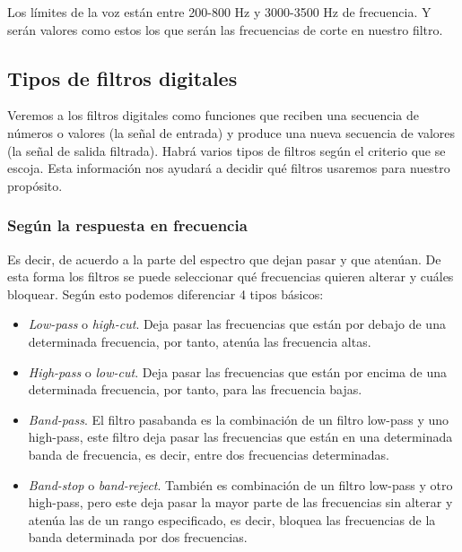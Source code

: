 Los límites de la voz están entre 200-800 Hz y 3000-3500 Hz de frecuencia. Y serán valores como estos los que serán las frecuencias de corte en nuestro filtro.

\subsection{Tipos de filtros digitales}

Veremos a los filtros digitales como funciones que reciben una secuencia de números o valores (la señal de entrada) y produce una nueva secuencia de valores (la señal de salida filtrada).
Habrá varios tipos de filtros según el criterio que se escoja. Esta información nos ayudará a decidir qué filtros usaremos para nuestro propósito.

\subsubsection{Según la respuesta en frecuencia}

Es decir, de acuerdo a la parte del espectro que dejan pasar y que atenúan. De esta forma los filtros se puede seleccionar qué frecuencias quieren alterar y cuáles bloquear. Según esto podemos diferenciar 4 tipos básicos:

\begin{itemize}
\item \emph{Low-pass} o \emph{high-cut}. Deja pasar las frecuencias que están por debajo de una determinada frecuencia, por tanto, atenúa las frecuencia altas.
\item \emph{High-pass} o \emph{low-cut}. Deja pasar las frecuencias que están por encima de una determinada frecuencia, por tanto, para las frecuencia bajas.
\item \emph{Band-pass}. El filtro pasabanda es la combinación de un filtro low-pass y uno high-pass, este filtro deja pasar las frecuencias que están en una determinada banda de frecuencia, es decir, entre dos frecuencias determinadas.
\item \emph{Band-stop} o \emph{band-reject}. También es combinación de un filtro low-pass y otro high-pass, pero este deja pasar la mayor parte de las frecuencias sin alterar y atenúa las de un rango especificado, es decir, bloquea las frecuencias de la banda determinada por dos frecuencias.
\end{itemize}


